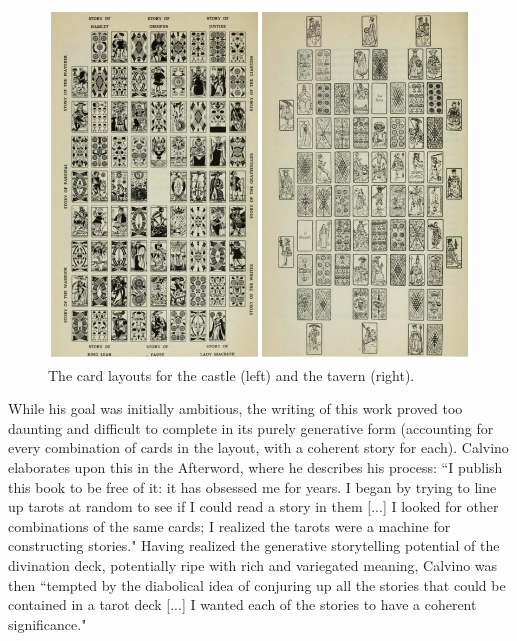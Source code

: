 
\begin{figure}
    \centering
    \includegraphics[width=\textwidth]{figures/2-Ice-Bound/castle-of-destinies.jpg}
    \caption{The card layouts for the castle (left) and the tavern (right).}
    \label{fig:calvino-castle}
\end{figure}



While his goal was initially ambitious, the writing of this work proved too daunting and difficult to complete in its purely generative form (accounting for every combination of cards in the layout, with a coherent story for each). Calvino elaborates upon this in the Afterword, where he describes his process: ``I publish this book to be free of it: it has obsessed me for years. I began by trying to line up tarots at random to see if I could read a story in them [...] I looked for other combinations of the same cards; I realized the tarots were a machine for constructing stories." Having realized the generative storytelling potential of the divination deck, potentially ripe with rich and variegated meaning, Calvino was then ``tempted by the diabolical idea of conjuring up all the stories that could be contained in a tarot deck [...] I wanted each of the stories to have a coherent significance."

